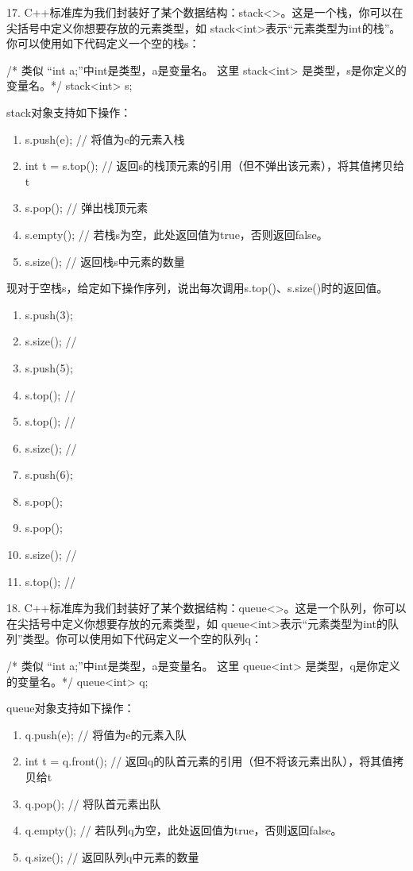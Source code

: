     17. C++标准库为我们封装好了某个数据结构：stack<>。这是一个栈，你可以在尖括号中定义你想要存放的元素类型，如
stack<int>表示“元素类型为int的栈”。你可以使用如下代码定义一个空的栈s：
\begin{cppcode}
/* 类似 “int a;”中int是类型，a是变量名。
    这里 stack<int> 是类型，s是你定义的变量名。*/
    stack<int> s;
\end{cppcode}
stack对象支持如下操作：
\begin{enumerate}[label=\arabic*）]
    \item s.push(e);    // 将值为e的元素入栈
    \item int t = s.top();      // 返回s的栈顶元素的引用（但不弹出该元素），将其值拷贝给t
    \item s.pop();      // 弹出栈顶元素
    \item s.empty();    // 若栈s为空，此处返回值为true，否则返回false。
    \item s.size();     // 返回栈s中元素的数量
\end{enumerate}
现对于空栈s，给定如下操作序列，说出每次调用s.top()、s.size()时的返回值。
\begin{enumerate}[label=\arabic*）]
    \item s.push(3);
    \item s.size(); //
    \item s.push(5);
    \item s.top();  //
    \item s.top();  //
    \item s.size(); //
    \item s.push(6);
    \item s.pop();
    \item s.pop();
    \item s.size(); //
    \item s.top();  //
\end{enumerate}

\vspace{\baselineskip}

    18. C++标准库为我们封装好了某个数据结构：queue<>。这是一个队列，你可以在尖括号中定义你想要存放的元素类型，如
queue<int>表示“元素类型为int的队列”类型。你可以使用如下代码定义一个空的队列q：
\begin{cppcode}
/* 类似 “int a;”中int是类型，a是变量名。
    这里 queue<int> 是类型，q是你定义的变量名。*/
    queue<int> q;
\end{cppcode}
queue对象支持如下操作：
\begin{enumerate}[label=\arabic*）]
    \item q.push(e);    // 将值为e的元素入队
    \item int t = q.front();      // 返回q的队首元素的引用（但不将该元素出队），将其值拷贝给t
    \item q.pop();      // 将队首元素出队
    \item q.empty();    // 若队列q为空，此处返回值为true，否则返回false。
    \item q.size();     // 返回队列q中元素的数量
\end{enumerate}

